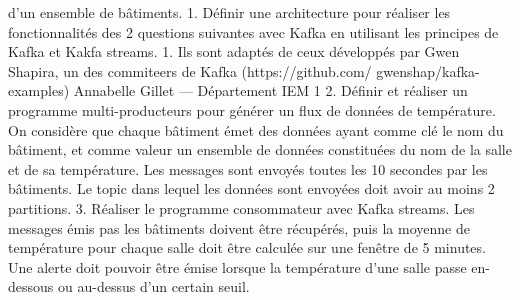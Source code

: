 d’un ensemble de bâtiments.
1. Définir une architecture pour réaliser les fonctionnalités des 2 questions suivantes avec Kafka
en utilisant les principes de Kafka et Kakfa streams.
1. Ils sont adaptés de ceux développés par Gwen Shapira, un des commiteers de Kafka (https://github.com/
gwenshap/kafka-examples)
Annabelle Gillet — Département IEM 1
2. Définir et réaliser un programme multi-producteurs pour générer un flux de données de température. On considère que chaque bâtiment émet des données ayant comme clé le nom du
bâtiment, et comme valeur un ensemble de données constituées du nom de la salle et de sa
température. Les messages sont envoyés toutes les 10 secondes par les bâtiments. Le topic dans
lequel les données sont envoyées doit avoir au moins 2 partitions.
3. Réaliser le programme consommateur avec Kafka streams. Les messages émis pas les bâtiments
doivent être récupérés, puis la moyenne de température pour chaque salle doit être calculée sur
une fenêtre de 5 minutes. Une alerte doit pouvoir être émise lorsque la température d’une salle
passe en-dessous ou au-dessus d’un certain seuil.




